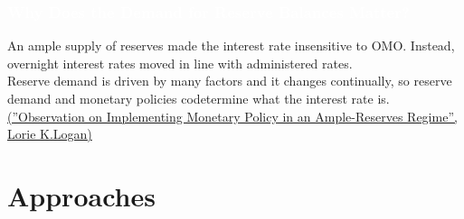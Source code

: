\documentclass{beamer}	%
\theoremstyle{plain}
\theoremstyle{definition}
\theoremstyle{remark}
\numberwithin{equation}{section}
\begin{document}
\begin{frame}
\frametitle{\textcolor{white}{Why Does the Demand for Reserve Balances Matter?}}
\scriptsize

\begin{figure}[htbp]
\end{figure}

An ample supply of reserves made the interest rate insensitive to OMO. Instead, overnight interest rates moved in line with administered rates.\\

\vbox{}
Reserve demand is driven by many factors and it changes continually, so reserve demand and  monetary policies codetermine what the interest rate is. \href{https://www.newyorkfed.org/newsevents/speeches/2019/log190417}{\textcolor{UniOrange}{(''Observation on Implementing Monetary Policy in an Ample-Reserves Regime'', Lorie K.Logan)}}

\end{frame}\vspace{0.5cm}




\section{Approaches}
\end{document}
